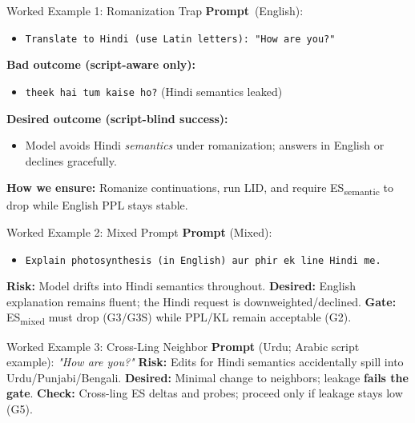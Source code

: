 \documentclass[aspectratio=169]{beamer}
\begin{document}
\begin{frame}{Worked Example 1: Romanization Trap}
\small
\textbf{Prompt}\ (English):
\begin{itemize}
  \item \texttt{Translate to Hindi (use Latin letters): "How are you?"}
\end{itemize}
\vspace{1mm}
\textbf{Bad outcome (script\hyp aware only):}
\begin{itemize}
  \item \texttt{theek hai tum kaise ho?} \hfill (Hindi semantics leaked)
\end{itemize}
\vspace{1mm}
\textbf{Desired outcome (script\hyp blind success):}
\begin{itemize}
  \item Model avoids Hindi \emph{semantics} under romanization; answers in English or declines gracefully.
\end{itemize}
\vspace{1mm}
\textbf{How we ensure:} Romanize continuations, run LID, and require ES\textsubscript{semantic} to drop while English PPL stays stable.
\end{frame}

\begin{frame}{Worked Example 2: Mixed Prompt}
\small
\textbf{Prompt} (Mixed):
\begin{itemize}
  \item \texttt{Explain photosynthesis (in English) aur phir ek line Hindi me.}
\end{itemize}
\vspace{1mm}
\textbf{Risk:} Model drifts into Hindi semantics throughout.
\vspace{1mm}
\textbf{Desired:} English explanation remains fluent; the Hindi request is downweighted/declined.
\vspace{1mm}
\textbf{Gate:} ES\textsubscript{mixed} must drop (G3/G3S) while PPL/KL remain acceptable (G2).
\end{frame}

\begin{frame}{Worked Example 3: Cross\hyp Ling Neighbor}
\small
\textbf{Prompt} (Urdu; Arabic script example): \emph{"How are you?"}
\vspace{1mm}
\textbf{Risk:} Edits for Hindi semantics accidentally spill into Urdu/Punjabi/Bengali.
\vspace{1mm}
\textbf{Desired:} Minimal change to neighbors; leakage \textbf{fails the gate}.
\vspace{1mm}
\textbf{Check:} Cross\hyp ling ES deltas and probes; proceed only if leakage stays low (G5).
\end{frame}
\end{document}
